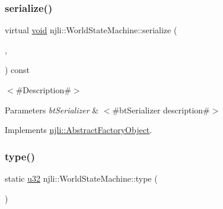\mbox{\label{classnjli_1_1_world_state_machine_a5c007981ac52707f7474e22b0b59c29a}} 
\subsubsection{\texorpdfstring{serialize()}{serialize()}}
{\footnotesize\ttfamily virtual \mbox{\hyperlink{_thread_8h_af1e856da2e658414cb2456cb6f7ebc66}{void}} njli\+::\+World\+State\+Machine\+::serialize (\begin{DoxyParamCaption}\item[{\mbox{\hyperlink{_thread_8h_af1e856da2e658414cb2456cb6f7ebc66}{void}} $\ast$}]{,  }\item[{bt\+Serializer $\ast$}]{ }\end{DoxyParamCaption}) const\hspace{0.3cm}{\ttfamily [virtual]}}

$<$\#\+Description\#$>$


\begin{DoxyParams}{Parameters}
{\em bt\+Serializer} & $<$\#bt\+Serializer description\#$>$ \\
\hline
\end{DoxyParams}


Implements \mbox{\hyperlink{classnjli_1_1_abstract_factory_object_aad2fbe86fb3bdecf02918a96b9c57976}{njli\+::\+Abstract\+Factory\+Object}}.

\mbox{\label{classnjli_1_1_world_state_machine_a89f24e7eea9edc502aa7a91549c72adc}} 
\subsubsection{\texorpdfstring{type()}{type()}}
{\footnotesize\ttfamily static \mbox{\hyperlink{_util_8h_a10e94b422ef0c20dcdec20d31a1f5049}{u32}} njli\+::\+World\+State\+Machine\+::type (\begin{DoxyParamCaption}{ }\end{DoxyParamCaption})\hspace{0.3cm}{\ttfamily [static]}}

